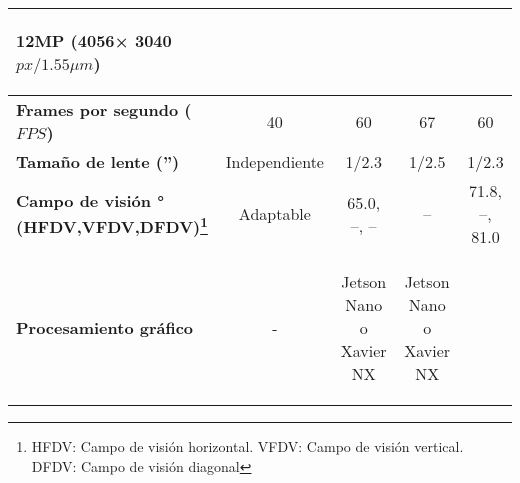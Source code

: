 \begin{savenotes}
\begin{mytable}[H]
\begin{tabular}{l|c|c|c|c|}
			\begin{minipage}{\mythirdmaxsizeofcontenttable}\begin{myflushcenterinsidetable}
				12MP (4056× 3040 $px/1.55{\mu}m$)
			\end{myflushcenterinsidetable}\end{minipage} 
			\\ \hline
			\multicolumn{1}{|l|}{
			\begin{minipage}{\myforthmaxsizeofcontenttable}	
				\textbf{Frames por segundo ($FPS$)}
			\end{minipage}
			} & 40 %
			& 60 & 67 & 
			60
			\\ \hline
			\multicolumn{1}{|l|}{
			\begin{minipage}{\myforthmaxsizeofcontenttable}	
				\textbf{Tamaño de lente ('')}
			\end{minipage}
			} & Independiente & 1/2.3 & 1/2.5 &
			1/2.3
			\\ \hline
			\multicolumn{1}{|l|}{
			\begin{minipage}{\myforthmaxsizeofcontenttable}
				\textbf{Campo de visión ° (HFDV,VFDV,DFDV)\footnote{HFDV: Campo de visión horizontal. VFDV: Campo de visión vertical. DFDV: Campo de visión diagonal}}
			\end{minipage}
			} & Adaptable & 65.0, --, -- & -- & 
			71.8, --, 81.0
			\\ \hline
			\multicolumn{1}{|l|}{
			\begin{minipage}{\myforthmaxsizeofcontenttable}	
				\textbf{Procesamiento gráfico}
			\end{minipage}
			} & - & 
			\begin{minipage}{\mythirdmaxsizeofcontenttable}\begin{myflushcenterinsidetable}
				Jetson Nano o Xavier NX
			\end{myflushcenterinsidetable}\end{minipage} & 
			\begin{minipage}{\mythirdmaxsizeofcontenttable}\begin{myflushcenterinsidetable}
				Jetson Nano o Xavier NX
			\end{myflushcenterinsidetable}\end{minipage}&

\end{tabular}
\end{mytable}
\end{savenotes}
